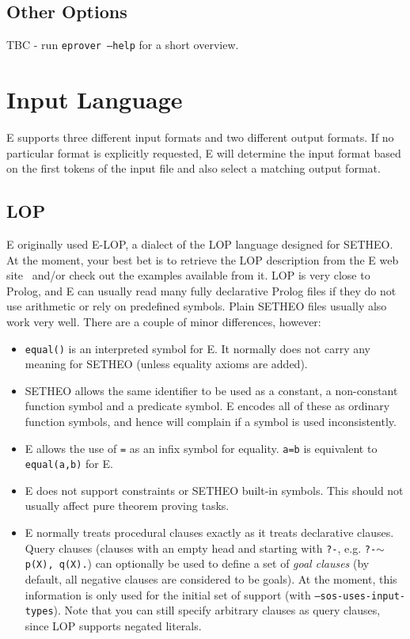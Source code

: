 \documentclass{report}
\begin{document}
\section{Other Options}
\label{sec:options:others}

TBC - run \texttt{eprover --help} for a short overview.


\chapter{Input Language}
\label{sec:language}

E supports three different input formats and two different output
formats. If no particular format is explicitly requested, E will
determine the input format based on the first tokens of the input file
and also select a matching output format.

\section{LOP}

E originally used E-LOP, a dialect of the LOP language
designed for SETHEO. At the moment, your best bet is to
retrieve the LOP description from the E web site~\cite{E:WWW-22}
and/or check out the examples available from it.  LOP is very close to
Prolog, and E can usually read many fully declarative Prolog files if
they do not use arithmetic or rely on predefined symbols. Plain SETHEO
files usually also work very well.  There are a couple of minor
differences, however:

\begin{itemize}
\item \texttt{equal()} is an interpreted symbol for E. It normally
  does not carry any meaning for SETHEO (unless equality axioms are
  added).
\item SETHEO allows the same identifier to be used as a constant, a
  non-constant function symbol and a predicate symbol. E encodes all
  of these as ordinary function symbols, and hence will complain if a
  symbol is used inconsistently.
\item E allows the use of \texttt{=} as an infix symbol for
  equality. \texttt{a=b} is equivalent to \texttt{equal(a,b)} for E.
\item E does not support constraints or SETHEO built-in
  symbols. This should not usually affect pure theorem proving tasks.
\item E normally treats procedural clauses exactly as it treats
  declarative clauses. Query clauses (clauses with an empty head and
  starting with \texttt{?-}, e.g. \texttt{?-$\sim$p(X), q(X).}) can
  optionally be used to define a set of \emph{goal clauses} (by
  default, all negative clauses are considered to be goals). At the
  moment, this information is only used for the initial set of support
  (with \texttt{--sos-uses-input-types}). Note that you can still
  specify arbitrary clauses as query clauses, since LOP supports
  negated literals.
\end{itemize}
\end{document}
